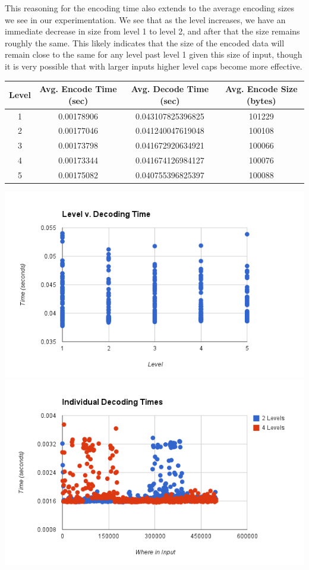 \documentclass{article}
\begin{document}
This reasoning for the encoding time also extends to the average encoding sizes we see in our experimentation. We see that as the level increases, we have an immediate decrease in size from level 1 to level 2, and after that the size remains roughly the same. This likely indicates that the size of the encoded data will remain close to the same for any level past level 1 given this size of input, though it is very possible that with larger inputs higher level caps become more effective. 

\begin{center}\smallskip
    \begin{tabular}{ | c | c | c | c |}
    \hline
    Level & Avg. Encode Time (sec) & Avg. Decode Time (sec) & Avg. Encode Size (bytes) \\ \hline
    1 & 0.00178906 & 0.043107825396825 & 101229\\
    2 & 0.00177046 & 0.041240047619048 & 100108\\
    3 & 0.00173798 & 0.041672920634921 & 100066\\
    4 & 0.00173344 & 0.041674126984127 & 100076\\
    5 & 0.00175082 & 0.040755396825397 & 100088\\ \hline
    \end{tabular}
\end{center}

\includegraphics[scale=0.4]{images/betterlevel_v_decode}
\includegraphics[scale=0.4]{images/individual_decodetime}
\afterpage{\vfill}
\end{document}
